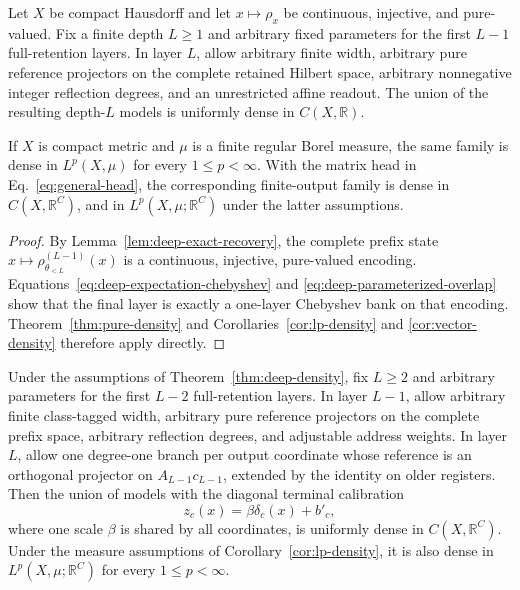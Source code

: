 \documentclass[pdflatex,sn-mathphys,NameDate,iicol]{sn-jnl}
\newcommand{\R}{\mathbb{R}}
\begin{document}
\begin{theorem}
\label{thm:deep-density}
Let $X$ be compact Hausdorff and let
$x\mapsto\rho_x$ be continuous, injective, and pure-valued. Fix a finite depth
$L\ge1$ and arbitrary fixed parameters for the first $L-1$ full-retention
layers. In layer $L$, allow arbitrary finite width, arbitrary pure reference
projectors on the complete retained Hilbert space, arbitrary nonnegative
integer reflection degrees, and an unrestricted affine readout. The union of
the resulting depth-$L$ models is uniformly dense in $C(X,\R)$.

If $X$ is compact metric and $\mu$ is a finite regular Borel measure, the same
family is dense in $L^p(X,\mu)$ for every $1\le p<\infty$. With the matrix
head in Eq.~\eqref{eq:general-head}, the corresponding finite-output family
is dense in $C(X,\R^C)$, and in $L^p(X,\mu;\R^C)$ under the latter assumptions.
\end{theorem}

\begin{proof}
By Lemma~\ref{lem:deep-exact-recovery}, the complete prefix state
$x\mapsto\rho_{\theta_{<L}}^{(L-1)}(x)$ is a continuous, injective,
pure-valued encoding. Equations~\eqref{eq:deep-expectation-chebyshev} and
\eqref{eq:deep-parameterized-overlap} show that the final layer is exactly a
one-layer Chebyshev bank on that encoding. Theorem~\ref{thm:pure-density} and
Corollaries~\ref{cor:lp-density} and \ref{cor:vector-density} therefore apply
directly.
\end{proof}

\begin{corollary}
\label{cor:deep-diagonal-density}
Under the assumptions of Theorem~\ref{thm:deep-density}, fix $L\ge2$ and
arbitrary parameters for the first $L-2$ full-retention layers. In layer
$L-1$, allow arbitrary finite class-tagged width, arbitrary pure reference
projectors on the complete prefix space, arbitrary reflection degrees, and
adjustable address weights. In layer $L$, allow one degree-one branch per
output coordinate whose reference is an orthogonal projector on
$A_{L-1}c_{L-1}$, extended by the identity on older registers. Then the union
of models with the diagonal terminal calibration
\begin{equation}
 z_c(x)=\beta\delta_c(x)+b'_c,
 \label{eq:deep-diagonal-head}
\end{equation}
where one scale $\beta$ is shared by all coordinates, is uniformly dense in
$C(X,\R^C)$. Under the measure assumptions of
Corollary~\ref{cor:lp-density}, it is also dense in
$L^p(X,\mu;\R^C)$ for every $1\le p<\infty$.
\end{corollary}
\end{document}
